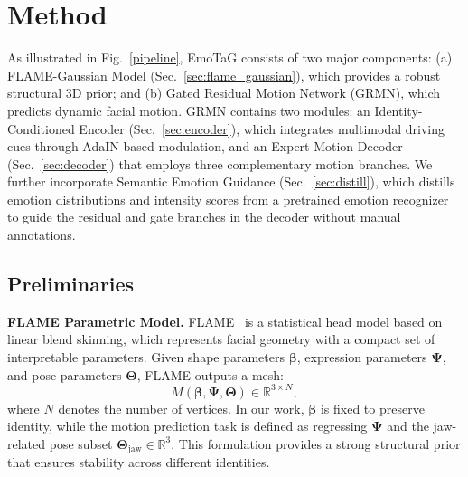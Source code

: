 \section{Method}
As illustrated in Fig.~\ref{pipeline}, EmoTaG consists of two major components:
(a) FLAME-Gaussian Model (Sec.~\ref{sec:flame_gaussian}), which provides a robust structural 3D prior; and 
(b) Gated Residual Motion Network (GRMN), which predicts dynamic facial motion. 
GRMN contains two modules: an Identity-Conditioned Encoder (Sec.~\ref{sec:encoder}), which integrates multimodal driving cues through AdaIN-based modulation, and an Expert Motion Decoder (Sec.~\ref{sec:decoder}) that employs three complementary motion branches. We further incorporate Semantic Emotion Guidance (Sec.~\ref{sec:distill}), which distills emotion distributions and intensity scores from a pretrained emotion recognizer~\cite{serengil2024lightface} to guide the residual and gate branches in the decoder without manual annotations.


\subsection{Preliminaries}

\textbf{FLAME Parametric Model.}
FLAME~\cite{li2017learning} is a statistical head model based on linear blend skinning, which represents facial geometry with a compact set of interpretable parameters. 
Given shape parameters $\boldsymbol{\beta}$, expression parameters $\boldsymbol{\Psi}$, and pose parameters $\boldsymbol{\Theta}$, FLAME outputs a mesh:
\begin{equation}
M(\boldsymbol{\beta}, \boldsymbol{\Psi}, \boldsymbol{\Theta}) \in \mathbb{R}^{3 \times N},
\label{eq:flame-mesh}
\end{equation}
where $N$ denotes the number of vertices. 
In our work, $\boldsymbol{\beta}$ is fixed to preserve identity, while the motion prediction task is defined as regressing $\boldsymbol{\Psi}$ and the jaw-related pose subset $\boldsymbol{\Theta}_{\text{jaw}} \in \mathbb{R}^{3}$. This formulation provides a strong structural prior that ensures stability across different identities. 

